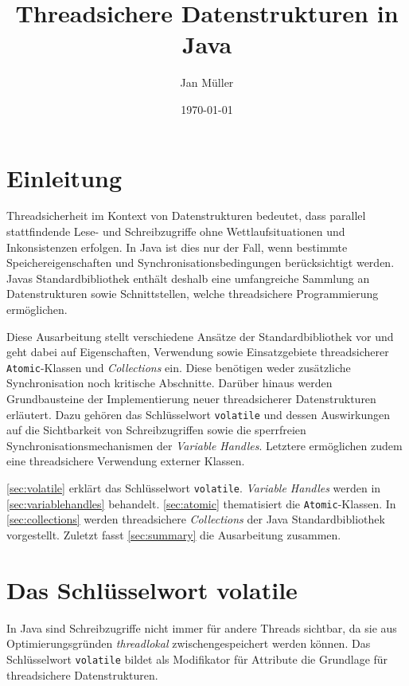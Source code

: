 \documentclass[a4paper, 11pt]{article}
\title{Threadsichere Datenstrukturen in Java}
\author{Jan Müller}
\date{\today}
\begin{document}
\maketitle


\section{Einleitung}
\label{sec:introduction}

Threadsicherheit im Kontext von Datenstrukturen bedeutet, dass parallel stattfindende Lese- und Schreibzugriffe ohne Wettlaufsituationen und Inkonsistenzen erfolgen.
In Java ist dies nur der Fall, wenn bestimmte Speichereigenschaften und Synchronisationsbedingungen berücksichtigt werden.
Javas Standardbibliothek enthält deshalb eine umfangreiche Sammlung an
 Datenstrukturen sowie Schnittstellen, welche threadsichere Programmierung ermöglichen.

Diese Ausarbeitung stellt verschiedene Ansätze der Standardbibliothek vor und geht dabei auf Eigenschaften, Verwendung sowie Einsatzgebiete threadsicherer \verb|Atomic|-Klassen und \textit{Collections} ein.
Diese benötigen weder zusätzliche Synchronisation noch kritische Abschnitte.
Darüber hinaus werden Grundbausteine der Implementierung neuer threadsicherer Datenstrukturen erläutert.
Dazu gehören das Schlüsselwort \verb|volatile| und dessen Auswirkungen auf die Sichtbarkeit von Schreibzugriffen sowie die sperrfreien Synchronisationsmechanismen der \textit{Variable Handles}.
Letztere ermöglichen zudem eine threadsichere Verwendung externer Klassen.

\autoref{sec:volatile} erklärt das Schlüsselwort \verb|volatile|.
\textit{Variable Handles} werden in \autoref{sec:variablehandles} behandelt.
\autoref{sec:atomic} thematisiert die \verb|Atomic|-Klassen.
In \autoref{sec:collections} werden threadsichere \textit{Collections} der Java Standardbibliothek vorgestellt.
Zuletzt fasst \autoref{sec:summary} die Ausarbeitung zusammen.

\section{Das Schlüsselwort volatile}
\label{sec:volatile}

In Java sind Schreibzugriffe nicht immer für andere Threads sichtbar, da sie aus Optimierungsgründen \textit{threadlokal} zwischengespeichert werden können.
Das Schlüsselwort \verb|volatile| bildet als Modifikator für Attribute die Grundlage für threadsichere Datenstrukturen.
\end{document}
